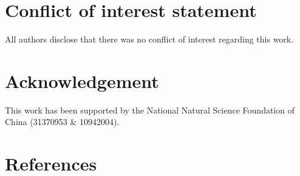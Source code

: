 \documentclass[review]{elsarticle}
\begin{document}
\section*{Conflict of interest statement}
All authors disclose that there was no conflict of interest regarding this work.
\section*{Acknowledgement}
This work has been supported by the National Natural Science Foundation of China (31370953 \& 10942004).

\section*{References}

\end{document}
